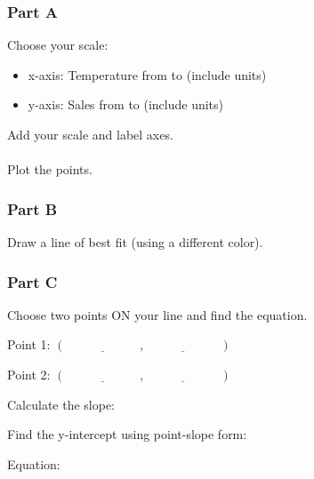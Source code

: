 \documentclass[12pt]{article}
\begin{document}
\begin{itemize}
			\subsubsection*{Part A}

				Choose your scale:
				\begin{itemize}
					\item x-axis: Temperature from \underline{\hspace{1in}} to \underline{\hspace{1in}} (include units)
					\item y-axis: Sales from \underline{\hspace{1in}} to \underline{\hspace{1in}} (include units)
				\end{itemize}

				Add your scale and label axes.\\\\
				Plot the points.

				\vspace{8cm}

			\subsubsection*{Part B}
				
				Draw a line of best fit (using a different color).

				\newpage

			\subsubsection*{Part C}
				
				Choose two points ON your line and find the equation.

				Point 1: $(\underline{\hspace{1in}}, \underline{\hspace{1in}})$

				Point 2: $(\underline{\hspace{1in}}, \underline{\hspace{1in}})$

				Calculate the slope:

				\vspace{2cm}

				Find the y-intercept using point-slope form:

				\vspace{2cm}

				Equation: \underline{\hspace{3in}}


\end{itemize}
\end{document}
